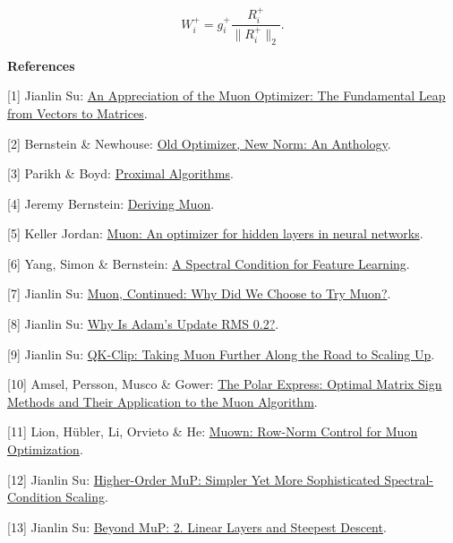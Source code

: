 \documentclass[
  english,
  10pt,
  a4paper,
]{article}
\begin{document}
\nopagebreak[4]

\[
\boxed{W_i^+=g_i^+\frac{R_i^+}{\|R_i^+\|_2}.}
\tag{34}
\]

\textbf{References}

{[}1{]} Jianlin Su: \href{https://kexue.fm/archives/10592}{An
Appreciation of the Muon Optimizer: The Fundamental Leap from Vectors to
Matrices}.

{[}2{]} Bernstein \& Newhouse:
\href{https://arxiv.org/abs/2409.20325v2}{Old Optimizer, New Norm: An
Anthology}.

{[}3{]} Parikh \& Boyd:
\href{https://web.stanford.edu/~boyd/papers/pdf/prox_algs.pdf}{Proximal
Algorithms}.

{[}4{]} Jeremy Bernstein:
\href{https://jeremybernste.in/writing/deriving-muon}{Deriving Muon}.

{[}5{]} Keller Jordan:
\href{https://kellerjordan.github.io/posts/muon/}{Muon: An optimizer for
hidden layers in neural networks}.

{[}6{]} Yang, Simon \& Bernstein:
\href{https://papers.cool/arxiv/2310.17813}{A Spectral Condition for
Feature Learning}.

{[}7{]} Jianlin Su: \href{https://kexue.fm/archives/10739}{Muon,
Continued: Why Did We Choose to Try Muon?}.

{[}8{]} Jianlin Su: \href{https://kexue.fm/archives/11267}{Why Is Adam's
Update RMS 0.2?}.

{[}9{]} Jianlin Su: \href{https://kexue.fm/archives/11126}{QK-Clip:
Taking Muon Further Along the Road to Scaling Up}.

{[}10{]} Amsel, Persson, Musco \& Gower:
\href{https://arxiv.org/abs/2505.16932}{The Polar Express: Optimal
Matrix Sign Methods and Their Application to the Muon Algorithm}.

{[}11{]} Lion, Hübler, Li, Orvieto \& He:
\href{https://arxiv.org/abs/2605.10797v1}{Muown: Row-Norm Control for
Muon Optimization}.

{[}12{]} Jianlin Su: \href{https://kexue.fm/archives/10795}{Higher-Order
MuP: Simpler Yet More Sophisticated Spectral-Condition Scaling}.

{[}13{]} Jianlin Su: \href{https://kexue.fm/archives/11605}{Beyond MuP:
2. Linear Layers and Steepest Descent}.
\end{document}
